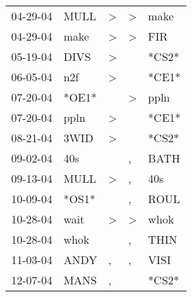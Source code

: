 \begin{supertabular}{p{0.07\textwidth}p{0.06\textwidth}p{0.02\textwidth}p{0.02\textwidth}p{0.06\textwidth}}
          04-29-04\textsuperscript{} &           MULL\textsuperscript{} &     \textgreater &     \textgreater &           make\textsuperscript{} \\
          04-29-04\textsuperscript{} &           make\textsuperscript{} &     \textgreater &     \textgreater &            FIR\textsuperscript{} \\
          05-19-04\textsuperscript{} &           DIVS\textsuperscript{} &     \textgreater &                  &                            *CS2* \\
          06-05-04\textsuperscript{} &            n2f\textsuperscript{} &     \textgreater &                  &                            *CE1* \\
          07-20-04\textsuperscript{} &                            *OE1* &                  &     \textgreater &           ppln\textsuperscript{} \\
          07-20-04\textsuperscript{} &           ppln\textsuperscript{} &     \textgreater &                  &                            *CE1* \\
          08-21-04\textsuperscript{} &           3WID\textsuperscript{} &     \textgreater &                  &                            *CS2* \\
          09-02-04\textsuperscript{} &            40s\textsuperscript{} &                  &                , &           BATH\textsuperscript{} \\
          09-13-04\textsuperscript{} &           MULL\textsuperscript{} &     \textgreater &                , &            40s\textsuperscript{} \\
          10-09-04\textsuperscript{} &                            *OS1* &                  &                , &           ROUL\textsuperscript{} \\
          10-28-04\textsuperscript{} &           wait\textsuperscript{} &     \textgreater &     \textgreater &           whok\textsuperscript{} \\
          10-28-04\textsuperscript{} &           whok\textsuperscript{} &                  &                , &           THIN\textsuperscript{} \\
          11-03-04\textsuperscript{} &           ANDY\textsuperscript{} &                , &                , &           VISI\textsuperscript{} \\
          12-07-04\textsuperscript{} &           MANS\textsuperscript{} &                , &                  &                            *CS2* \\

\end{supertabular}
